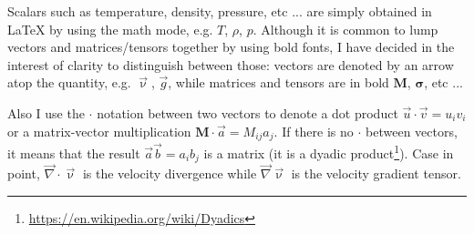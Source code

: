 Scalars such as temperature, density, pressure, etc ... are simply 
obtained in \LaTeX{} by using the math mode, e.g. $T$, $\rho$, $p$.
Although it is common to lump vectors and matrices/tensors together
by using bold fonts, I have decided in the interest of clarity to 
distinguish between those: vectors are denoted by an arrow 
atop the quantity, e.g. $\vec \upnu$, $\vec g$, while matrices 
and tensors are in bold $\bm M$, $\bm \sigma$, etc ...

Also I use the $\cdot$ notation between two vectors to denote a 
dot product $\vec u \cdot \vec v = u_iv_i$ or a matrix-vector
multiplication ${\bm M}\cdot \vec a = M_{ij}a_j$. If there is no
$\cdot$ between vectors, it means that the result 
$\vec a \vec b = a_ib_j$ is a matrix (it is a dyadic 
product\footnote{\url{https://en.wikipedia.org/wiki/Dyadics}}).
Case in point, $\vec\nabla\cdot\vec\upnu$ is the velocity divergence
while $\vec\nabla\vec\upnu$ is the velocity gradient tensor.
